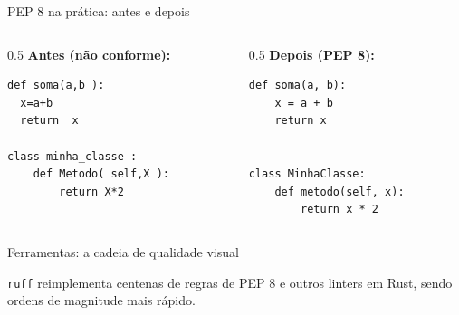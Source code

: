 \documentclass[aspectratio=169]{beamer}
\begin{document}
\begin{frame}[fragile]{PEP 8 na prática: antes e depois}
\begin{columns}[T]
\begin{column}{0.5\textwidth}
\textbf{Antes (não conforme):}
\begin{lstlisting}
def soma(a,b ):
  x=a+b
  return  x

class minha_classe :
    def Metodo( self,X ):
        return X*2
\end{lstlisting}
\end{column}
\begin{column}{0.5\textwidth}
\textbf{Depois (PEP 8):}
\begin{lstlisting}
def soma(a, b):
    x = a + b
    return x


class MinhaClasse:
    def metodo(self, x):
        return x * 2
\end{lstlisting}
\end{column}
\end{columns}
\end{frame}

\begin{frame}{Ferramentas: a cadeia de qualidade visual}
  \begin{center}
  \end{center}
  \vspace{0.5em}
  \footnotesize \texttt{ruff} reimplementa centenas de regras de PEP 8 e
  outros linters em Rust, sendo ordens de magnitude mais rápido.
\end{frame}
\end{document}
